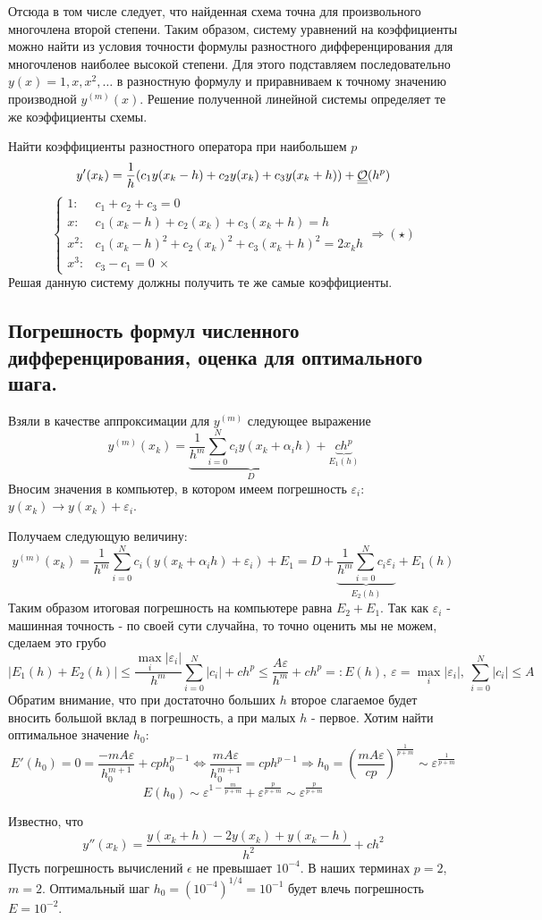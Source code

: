 Отсюда в том числе следует, что найденная схема точна для произвольного
многочлена второй степени. Таким образом, систему уравнений на
коэффициенты можно найти из условия точности формулы разностного
дифференцирования для многочленов наиболее высокой степени. Для этого
подставляем последовательно $y(x)=1,x,x^2,\ldots$ в разностную формулу
и приравниваем к точному значению производной $y^{(m)}(x)$.
Решение полученной линейной системы определяет те же коэффициенты схемы.
\begin{example}
  Найти коэффициенты разностного оператора при наибольшем $p$
  \[y'(x_k)=\frac{1}{h}(c_1y(x_k-h)+c_2y(x_k)+c_3y(x_k+h))+\underline{\underline{\mathcal{O}}}(h^p)\]
  \[\begin{cases}
      1:   & c_1+c_2+c_3=0                                \\
      x:   & c_1(x_k-h)+c_2(x_k)+c_3(x_k+h)=h             \\
      x^2: & c_1(x_k-h)^2+c_2(x_k)^2 + c_3(x_k+h)^2=2x_kh \\
      x^3: & c_3-c_1=0\ \times
    \end{cases}\Rightarrow (\star)\]
  Решая данную систему должны получить те же самые коэффициенты.
\end{example}

\subsection*{Погрешность формул
  численного дифференцирования, оценка для оптимального шага.}

Взяли в качестве аппроксимации для $y^{(m)}$ следующее выражение
\[y^{(m)}(x_k)=\underbrace{\frac{1}{h^m}\sum_{i=0}^Nc_iy(x_k+\alpha_ih)}_{D}+\underbrace{ch^p}_{E_1(h)}\]
Вносим значения в компьютер, в котором имеем погрешность $\varepsilon_i$: $y(x_k)\rightarrow y(x_k)+\varepsilon_i$.

Получаем следующую величину:
\[y^{(m)}(x_k)=\frac{1}{h^m}\sum_{i=0}^Nc_i(y(x_k+\alpha_ih)+\varepsilon_i)+E_1=D+\underbrace{\frac{1}{h^m}\sum_{i=0}^Nc_i\varepsilon_i}_{E_2(h)}+E_1(h)\]
Таким образом итоговая погрешность на компьютере равна $E_2+E_1$. Так как $\varepsilon_i$ - машинная точность - по своей сути случайна,
то точно оценить мы не можем, сделаем это грубо
\[|E_1(h)+E_2(h)|\leq\frac{\max_{i}|\varepsilon_i|}{h^m}\sum_{i=0}^{N}|c_i|+ch^p\leq\frac{A\varepsilon}{h^m}+ch^p=:E(h),\ \varepsilon=\max_{i}|\varepsilon_i|,\ \sum_{i=0}^{N}|c_i|\leq A\]
Обратим внимание, что при достаточно больших $h$ второе слагаемое будет вносить большой вклад в погрешность,
а при малых $h$ - первое. Хотим найти оптимальное значение $h_0$:
\[E'(h_0)=0=\frac{-mA\varepsilon}{h_0^{m+1}}+cph_0^{p-1}\Leftrightarrow\frac{mA\varepsilon}{h_0^{m+1}}=cph^{p-1}\Rightarrow h_0=\left(\frac{mA\varepsilon}{cp}\right)^{\frac{1}{p+m}}\sim\varepsilon^{\frac{1}{p+m}}\]
\[E(h_0)\sim \varepsilon^{1-\frac{m}{p+m}}+\varepsilon^{\frac{p}{p+m}}\sim\varepsilon^{\frac{p}{p+m}}\]
\begin{example}
  Известно, что
  \[y''(x_k)=\frac{y(x_k+h)-2y(x_k)+y(x_k-h)}{h^2}+ch^2\]
  Пусть погрешность вычислений $\epsilon$ не превышает $10^{-4}$.
  В наших терминах $p=2$, $m=2$. Оптимальный шаг $h_0=(10^{-4})^{1/4}=10^{-1}$ будет влечь погрешность $E=10^{-2}$.
\end{example}
